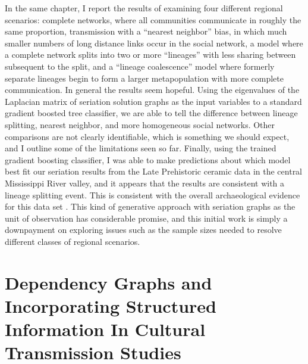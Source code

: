 In the same chapter, I report the results of examining four different regional scenarios:  complete networks, where all communities communicate in roughly the same proportion, transmission with a ``nearest neighbor'' bias, in which much smaller numbers of long distance links occur in the social network, a model where a complete network splits into two or more ``lineages'' with less sharing between subsequent to the split, and a ``lineage coalescence'' model where formerly separate lineages begin to form a larger metapopulation with more complete communication.  In general the results seem hopeful.  Using the eigenvalues of the Laplacian matrix of seriation solution graphs as the input variables to a standard gradient boosted tree classifier, we are able to tell the difference between lineage splitting, nearest neighbor, and more homogeneous social networks.  Other comparisons are not clearly identifiable, which is something we should expect, and I outline some of the limitations seen so far.  Finally, using the trained gradient boosting classifier, I was able to make predictions about which model best fit our seriation results from the Late Prehistoric ceramic data in the central Mississippi River valley, and it appears that the results are consistent with a lineage splitting event.  This is consistent with the overall archaeological evidence for this data set \citep{Lipo2001}.  This kind of generative approach with seriation graphs as the unit of observation has considerable promise, and this initial work is simply a downpayment on exploring issues such as the sample sizes needed to resolve different classes of regional scenarios.  

\section{Dependency Graphs and Incorporating Structured Information In Cultural Transmission Studies}

